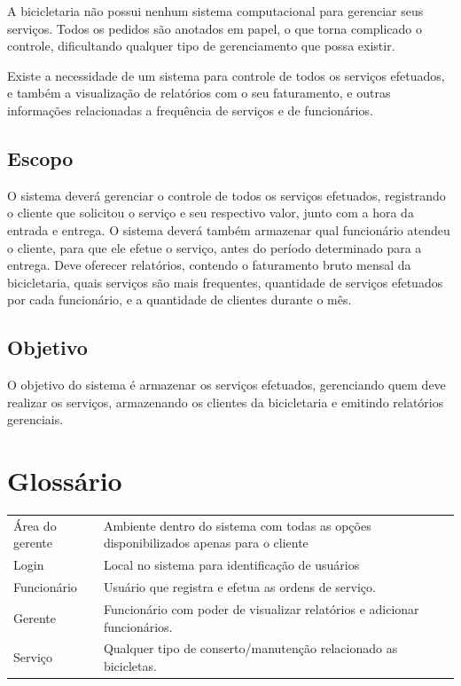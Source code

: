 \documentclass[
	12pt,				%
	openright,
	oneside,			%
	a4paper,			%
	chapter=TITLE,		%
	brazil				%
	]{abntex2}
\begin{document}
A bicicletaria não possui nenhum sistema computacional para gerenciar seus serviços. Todos os pedidos são anotados em papel, o que torna complicado o controle, dificultando qualquer tipo de gerenciamento que possa existir.

Existe a necessidade de um sistema para controle de todos os serviços efetuados, e também a visualização de relatórios com o seu faturamento, e outras informações relacionadas a frequência de serviços e de funcionários.

\section{Escopo}

O sistema deverá gerenciar o controle de todos os serviços efetuados, registrando o cliente que solicitou o serviço e seu respectivo valor, junto com a hora da entrada e entrega. O sistema deverá também armazenar qual funcionário atendeu o cliente, para que ele efetue o serviço, antes do período determinado para a entrega. Deve oferecer relatórios, contendo o  faturamento bruto mensal da bicicletaria, quais serviços são mais frequentes, quantidade de serviços efetuados por cada funcionário, e a quantidade de clientes durante o mês.

\section{Objetivo}

O objetivo do sistema é armazenar os serviços efetuados, gerenciando quem deve realizar os serviços, armazenando os clientes da bicicletaria e emitindo relatórios gerenciais.

\newpage
\chapter{Glossário}

\begin{flushleft}
\begin{tabular}{ p{3cm} p{12cm} }
  Área do gerente  & Ambiente dentro do sistema com todas as opções disponibilizados apenas para o cliente\\
  Login				& Local no sistema para identificação de usuários 								\\
  Funcionário 		& Usuário que registra e efetua as ordens de serviço.				 			\\
  Gerente 			& Funcionário com poder de visualizar relatórios e adicionar funcionários.	\\
  Serviço 			& Qualquer tipo de conserto/manutenção relacionado as bicicletas. 			\\


\end{tabular}
\end{flushleft}
\end{document}
